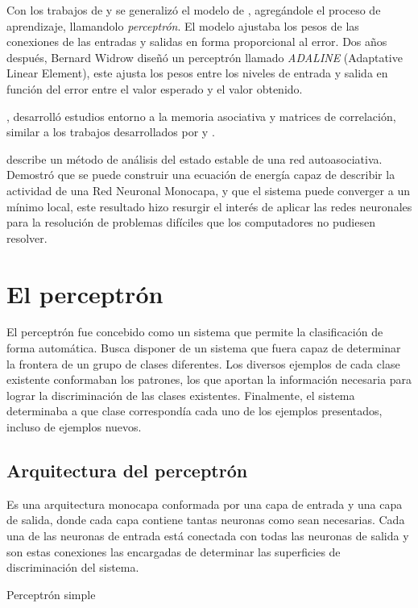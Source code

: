 Con los trabajos de  y  se generalizó el modelo de , agregándole el proceso de aprendizaje, llamandolo {\em perceptrón}. El modelo ajustaba los pesos de las conexiones de las entradas y salidas en forma proporcional al error. Dos años después, Bernard Widrow diseñó un perceptrón llamado {\em ADALINE} (Adaptative Linear Element), este ajusta los pesos entre los niveles de entrada y salida en función del error entre el valor esperado y el valor obtenido.

, desarrolló estudios entorno a la memoria asociativa y matrices de correlación, similar a los trabajos desarrollados por  y .

 describe un método de análisis del estado estable de una red autoasociativa. Demostró que se puede construir una ecuación de energía capaz de describir la actividad de una Red Neuronal Monocapa, y que el sistema puede converger a un mínimo local, este resultado hizo resurgir el interés de aplicar las redes neuronales para la resolución de problemas difíciles que los computadores no pudiesen resolver.

\section{El perceptrón}
El perceptrón fue concebido como un sistema que permite la clasificación de forma automática. Busca disponer de un sistema que fuera capaz de determinar la frontera de un grupo de clases diferentes. Los diversos ejemplos de cada clase existente conformaban los patrones, los que aportan la información necesaria para lograr la discriminación de las clases existentes. Finalmente, el sistema determinaba a que clase correspondía cada uno de los ejemplos presentados, incluso de ejemplos nuevos.

\subsection{Arquitectura del perceptrón}
Es una arquitectura monocapa conformada por una capa de entrada y una capa de salida, donde cada capa contiene tantas neuronas como sean necesarias. Cada una de las neuronas de entrada está conectada con todas las neuronas de salida y son estas conexiones las encargadas de determinar las superficies de discriminación del sistema.
\begin{imagen}
	\scalebox{1.5}{}
	\caption{Perceptrón simple}
	\label{fig:perceptron}
\end{imagen}

